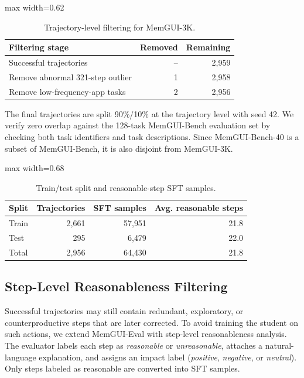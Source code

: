 \begin{table}[h]
\centering
\footnotesize
\begin{adjustbox}{max width=0.62\linewidth}
\begin{tabular}{lrr}
\toprule
Filtering stage & Removed & Remaining \\
\midrule
Successful trajectories & -- & 2{,}959 \\
Remove abnormal 321-step outlier & 1 & 2{,}958 \\
Remove low-frequency-app tasks & 2 & 2{,}956 \\
\bottomrule
\end{tabular}
\end{adjustbox}
\caption{Trajectory-level filtering for MemGUI-3K.}
\label{tab:appendix-filtering}
\end{table}

The final trajectories are split 90\%/10\% at the trajectory level with seed 42. We verify zero overlap against the 128-task MemGUI-Bench evaluation set by checking both task identifiers and task descriptions. Since MemGUI-Bench-40 is a subset of MemGUI-Bench, it is also disjoint from MemGUI-3K.

\begin{table}[h]
\centering
\footnotesize
\begin{adjustbox}{max width=0.68\linewidth}
\begin{tabular}{lrrr}
\toprule
Split & Trajectories & SFT samples & Avg. reasonable steps \\
\midrule
Train & 2{,}661 & 57{,}951 & 21.8 \\
Test & 295 & 6{,}479 & 22.0 \\
\midrule
Total & 2{,}956 & 64{,}430 & 21.8 \\
\bottomrule
\end{tabular}
\end{adjustbox}
\caption{Train/test split and reasonable-step SFT samples.}
\label{tab:appendix-split}
\end{table}

\subsection{Step-Level Reasonableness Filtering}
\label{sec:appendix-step-filtering}

Successful trajectories may still contain redundant, exploratory, or counterproductive steps that are later corrected. To avoid training the student on such actions, we extend MemGUI-Eval with step-level reasonableness analysis. The evaluator labels each step as \emph{reasonable} or \emph{unreasonable}, attaches a natural-language explanation, and assigns an impact label (\emph{positive}, \emph{negative}, or \emph{neutral}). Only steps labeled as reasonable are converted into SFT samples.

